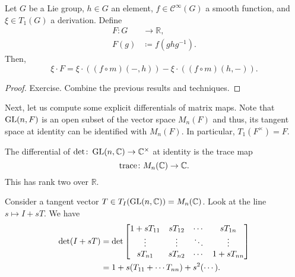 \documentclass[12pt]{article}
\begin{document}
\begin{cor} \label{cor:derivation-applied-to-int-g-h}
	Let $G$ be a Lie group, $h \in G$ an element, $f \in \mathcal{C}^{\infty}(G)$ a smooth function, and $\xi \in T_{1}(G)$ a derivation. 
	Define
	\begin{align*} 
		F \colon G & \to \mathbb{R}, \\
		F(g) & \coloneqq f(g h g^{-1}).
	\end{align*}
	Then,
	\begin{equation*} 
		\xi \cdot F = \xi \cdot \left((f \circ m)(-, h)\right) - \xi \cdot \left((f \circ m)(h, -)\right).
	\end{equation*}
\end{cor}
\begin{proof} 
	Exercise. Combine the previous results and techniques.
\end{proof}

Next, let us compute some explicit differentials of matrix maps. Note that $\operatorname{GL}(n, F)$ is an open subset of the vector space $M_{n}(F)$ and thus, its tangent space at identity can be identified with $M_{n}(F)$. \newline
In particular, $T_{1}(F^{\times}) = F$.

\begin{thm} \label{thm:diff-complex-det-is-trace}
	The differential of $\det \colon \operatorname{GL}(n, \mathbb{C}) \to \mathbb{C}^{\times}$ at identity is the trace map
	\begin{equation*} 
		\operatorname{trace} \colon M_{n}(\mathbb{C}) \to \mathbb{C}.
	\end{equation*}
	This has rank two over $\mathbb{R}$.
\end{thm}
\begin{sketch}
	Consider a tangent vector $T \in T_{I}(\operatorname{GL}(n, \mathbb{C})) = M_{n}(\mathbb{C})$. 
	Look at the line $s \mapsto I + sT$. 
	We have
	\begin{align*} 
		\det(I + sT) &
		= \det
		\begin{bmatrix}
			1 + s T_{11} & s T_{12} & \cdots & s T_{1n} \\
			\vdots & \vdots & \ddots & \vdots \\
			s T_{n1} & s T_{n2} & \cdots & 1 + s T_{nn} \\
		\end{bmatrix} \\
		&= 1 + s(T_{11} + \cdots T_{nn}) + s^{2}(\cdots). \qedhere
	\end{align*}
\end{sketch}
\end{document}
